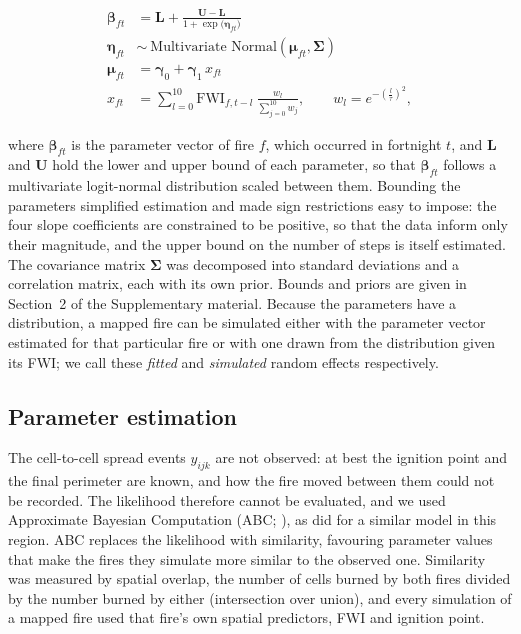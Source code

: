 \documentclass[ResearchPaper,linenum]{CSIRO_LaTeX_Template}
\begin{document}
\begin{equation}
\label{eq:hier1}
\begin{aligned}
    \boldsymbol{\beta}_{ft} &= \mathbf{L} + \frac{\mathbf{U} - \mathbf{L}}{1 + \exp{(\boldsymbol{\eta}_{ft}})} \\
    \boldsymbol{\eta}_{ft} &\sim \ \text{Multivariate Normal}(\boldsymbol{\mu}_{ft}, \boldsymbol{\Sigma}) \\
    \boldsymbol{\mu}_{ft} &= \boldsymbol{\gamma}_0 + \boldsymbol{\gamma}_1 \, x_{ft} \\
    x_{ft} &= \sum_{l=0}^{10} \mathrm{FWI}_{f,t-l} \ \frac{w_l}{\sum_{j=0}^{10} w_j},
    \qquad w_l = e^{-\left(\frac{l}{\tau}\right)^2},
\end{aligned}
\end{equation}

\noindent where $\boldsymbol{\beta}_{ft}$ is the parameter vector of fire $f$, which
occurred in fortnight $t$, and $\mathbf{L}$ and $\mathbf{U}$ hold the lower and upper
bound of each parameter, so that $\boldsymbol{\beta}_{ft}$ follows a multivariate
logit-normal distribution scaled between them. Bounding the parameters simplified
estimation and made sign restrictions easy to impose: the four slope coefficients are
constrained to be positive, so that the data inform only their magnitude, and the upper
bound on the number of steps is itself estimated. The covariance matrix
$\boldsymbol{\Sigma}$ was decomposed into standard deviations and a correlation matrix,
each with its own prior. Bounds and priors are given in Section~2 of the Supplementary
material. Because the parameters have a distribution, a mapped fire can be simulated
either with the parameter vector estimated for that particular fire or with one drawn
from the distribution given its FWI; we call these \textit{fitted} and
\textit{simulated} random effects respectively.

\subsection{Parameter estimation}

The cell-to-cell spread events $y_{ijk}$ are not observed: at best the ignition point
and the final perimeter are known, and how the fire moved between them could not be
recorded. The likelihood therefore cannot be evaluated, and we used Approximate
Bayesian Computation (ABC; \citealt{beaumont2010approximate, sisson2018handbook}), as
\citet{morales_stochastic_2015} did for a similar model in this region. 
ABC replaces the likelihood with similarity, favouring parameter values that make the fires they
simulate more similar to the observed one. Similarity was measured by spatial overlap, the
number of cells burned by both fires divided by the number burned by either 
(intersection over union), and every
simulation of a mapped fire used that fire's own spatial predictors, FWI and ignition
point.
\end{document}
